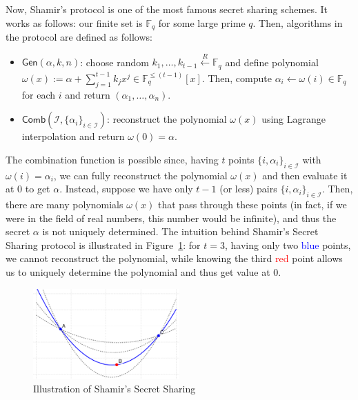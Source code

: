 \documentclass[../lecture-notes-148x210.tex]{subfiles}
\begin{document}
Now, Shamir's protocol is one of the most famous secret sharing schemes. It works as follows: our finite set is $\mathbb{F}_q$ for some large prime $q$. Then, algorithms in the protocol are defined as follows:
\begin{itemize}
    \item $\mathsf{Gen}(\alpha, k, n)$: choose random $k_1,\dots,k_{t-1}
    \xleftarrow[]{R} \mathbb{F}_q$ and define polynomial $\omega(x) := \alpha +
    \sum_{j=1}^{t-1}k_jx^j \in \mathbb{F}_q^{\leq (t-1)}[x]$. Then, compute
    $\alpha_i \gets \omega(i) \in \mathbb{F}_q$ for each $i$ and return
    $(\alpha_1,\dots,\alpha_n)$.
    \item $\mathsf{Comb}(\mathcal{I}, \{\alpha_i\}_{i \in \mathcal{I}})$: reconstruct the polynomial $\omega(x)$ using Lagrange interpolation and return $\omega(0) = \alpha$.
\end{itemize}

The combination function is possible since, having $t$ points $\{i,\alpha_i\}_{i
\in \mathcal{I}}$ with $\omega(i) = \alpha_i$, we can fully reconstruct the
polynomial $\omega(x)$ and then evaluate it at $0$ to get $\alpha$. Instead,
suppose we have only $t-1$ (or less) pairs $\{i,\alpha_i\}_{i \in \mathcal{I}}$.
Then, there are many polynomials $\omega(x)$ that pass through these points (in
fact, if we were in the field of real numbers, this number would be infinite),
and thus the secret $\alpha$ is not uniquely determined. The intuition behind
Shamir's Secret Sharing protocol is illustrated in Figure~\ref{fig:shamir}: for
$t=3$, having only two \textcolor{blue}{blue} points, we cannot reconstruct the
polynomial, while knowing the third \textcolor{red}{red} point allows us to
uniquely determine the polynomial and thus get value at $0$.

\vspace{-2mm}

\begin{figure}[H]
    \centering
    \includegraphics[width=0.5\textwidth]{images/lecture_1/shamir_demo.pdf}
    \caption{Illustration of Shamir's Secret Sharing}
    \label{fig:shamir}
\end{figure}
\end{document}
